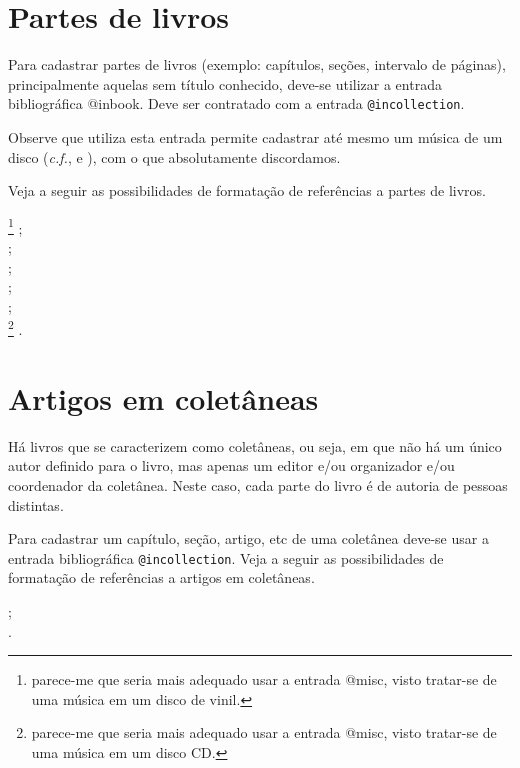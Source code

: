 \begin{apendicesenv}
\section{Partes de livros}
\label{sec:inbooks}


Para cadastrar partes de livros (exemplo: capítulos, seções, intervalo de páginas), principalmente aquelas sem título conhecido, deve-se utilizar a entrada bibliográfica {\ttfamily @inbook}. Deve ser contratado com a entrada \verb|@incollection|.

Observe que  utiliza esta entrada permite cadastrar até mesmo um música de um disco (\textit{c.f.},  e ), com o que absolutamente discordamos.

Veja a seguir as possibilidades de formatação de referências a partes de livros.


{\small
	\cite{Alcionep1988a}\footnote{parece-me que seria mais adequado usar a entrada {\ttfamily @misc}, visto tratar-se de uma música em um disco de vinil.} ;\\
	\cite{brasil1994} ;\\
	\cite{priberam1998} ;\\  
	\cite{santos1994} ;\\
	\cite{secretaria1999} ;\\
	\cite{simonej1977}\footnote{parece-me que seria mais adequado usar a entrada {\ttfamily @misc}, visto tratar-se de uma música em um disco CD.} .\\
}



\section{Artigos em coletâneas}
\label{sec:incollection}


Há livros que se caracterizem como coletâneas, ou seja, em que não há um único autor definido para o livro, mas apenas um editor e/ou organizador e/ou coordenador da coletânea. Neste caso, cada parte do livro é de autoria de pessoas distintas.

Para cadastrar um capítulo, seção, artigo, etc de uma coletânea deve-se usar a entrada bibliográfica \verb|@incollection|. Veja a seguir as possibilidades de formatação de referências a artigos em coletâneas.


{\small
	\cite{rego1991} ;\\
	\cite{romano1996}.\\
}




\end{apendicesenv}
